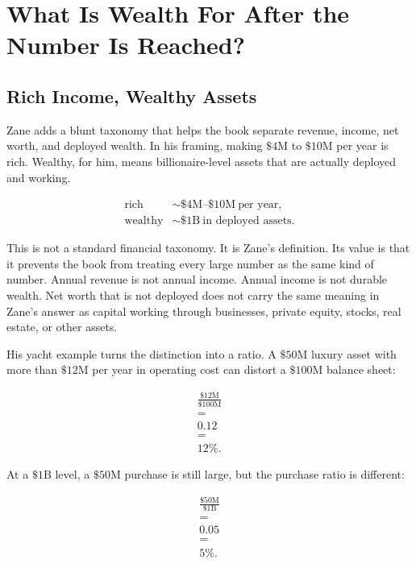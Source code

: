 \documentclass[11pt,oneside]{book}
\begin{document}
\chapter{What Is Wealth For After the Number Is Reached?}

\section{Rich Income, Wealthy Assets}

Zane adds a blunt taxonomy that helps the book separate revenue, income, net worth, and deployed wealth. In his framing, making \(\$4\mathrm{M}\) to \(\$10\mathrm{M}\) per year is rich. Wealthy, for him, means billionaire-level assets that are actually deployed and working.

\begin{align}
\text{rich} &\sim \$4\mathrm{M}\text{--}\$10\mathrm{M}\ \text{per year},\\
\text{wealthy} &\sim \$1\mathrm{B}\ \text{in deployed assets}.
\end{align}

This is not a standard financial taxonomy. It is Zane's definition. Its value is that it prevents the book from treating every large number as the same kind of number. Annual revenue is not annual income. Annual income is not durable wealth. Net worth that is not deployed does not carry the same meaning in Zane's answer as capital working through businesses, private equity, stocks, real estate, or other assets.

His yacht example turns the distinction into a ratio. A \(\$50\mathrm{M}\) luxury asset with more than \(\$12\mathrm{M}\) per year in operating cost can distort a \(\$100\mathrm{M}\) balance sheet:

\begin{equation}
\begin{gathered}
\frac{\$12\mathrm{M}}{\$100\mathrm{M}}\\
=\\
0.12\\
=\\
12\%.
\end{gathered}
\end{equation}

At a \(\$1\mathrm{B}\) level, a \(\$50\mathrm{M}\) purchase is still large, but the purchase ratio is different:

\begin{equation}
\begin{gathered}
\frac{\$50\mathrm{M}}{\$1\mathrm{B}}\\
=\\
0.05\\
=\\
5\%.
\end{gathered}
\end{equation}
\end{document}
